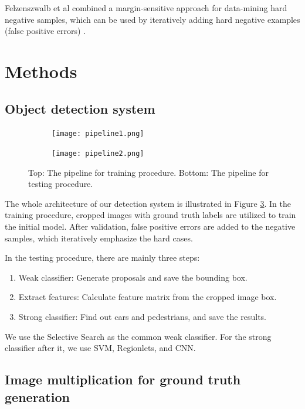 \documentclass{article} %
\begin{document}
Felzenszwalb et al \cite{felzenszwalb2010object} combined a margin-sensitive approach for data-mining hard negative samples, which can be used by iteratively adding hard negative examples (false positive errors) \cite{van2011segmentation}.

\section{Methods}

\subsection{Object detection system}


\begin{figure}[htb]
\begin{subfigure}[b]{0.9\textwidth}
    \centering
    \texttt{[image: pipeline1.png]}
    \label{fig:pipeline1}
\end{subfigure}
\begin{subfigure}[b]{0.9\textwidth}
    \centering
    \texttt{[image: pipeline2.png]}
    \label{fig:pipeline2}
\end{subfigure}
\caption{Top: The pipeline for training procedure. Bottom: The pipeline for testing procedure.
\label{fig:pipeline}}
\end{figure}


The whole architecture of our detection system is illustrated in Figure \ref{fig:pipeline}. In the training procedure, cropped images with ground truth labels are utilized to train the initial model. After validation, false positive errors are added to the negative samples, which iteratively emphasize the hard cases. 

In the testing procedure, there are mainly three steps: 
\begin{enumerate}[Step 1]
    \item Weak classifier: Generate proposals and save the bounding box.
    \item Extract features: Calculate feature matrix from the cropped image box.
    \item Strong classifier: Find out cars and pedestrians, and save the results.
\end{enumerate}

We use the Selective Search \cite{van2011segmentation} as the common weak classifier. For the strong classifier after it, we use SVM, Regionlets, and CNN.

\subsection{Image multiplication for ground truth generation}
\label{sec:positive}
\end{document}

